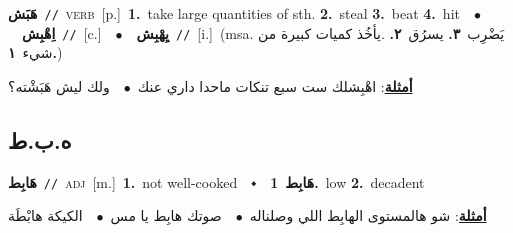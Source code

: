 \documentclass[10pt,a4paper,twoside]{article} %
\begin{document}
\begin{multicols}{2}
{\setlength\topsep{0pt}\textbf{\foreignlanguage{arabic}{هَبَش}}\ {\color{gray}\texttt{//}\color{black}}\ \textsc{verb}\ [p.]\ \textbf{1.}~take large quantities of sth.  \textbf{2.}~steal  \textbf{3.}~beat  \textbf{4.}~hit\ \ $\bullet$\ \ \setlength\topsep{0pt}\textbf{\foreignlanguage{arabic}{اِهْبِش}}\ {\color{gray}\texttt{//}\color{black}}\ [c.]\ \ $\bullet$\ \ \setlength\topsep{0pt}\textbf{\foreignlanguage{arabic}{يِهْبِش}}\ {\color{gray}\texttt{//}\color{black}}\ [i.]\ \color{gray}(msa. \foreignlanguage{arabic}{يَضْرِب}~\foreignlanguage{arabic}{\textbf{٣.}}  \foreignlanguage{arabic}{يسرُق}~\foreignlanguage{arabic}{\textbf{٢.}}  .\foreignlanguage{arabic}{يأخُذ كميات كبيرة من شيء}~\foreignlanguage{arabic}{\textbf{١.}})\color{black}\  \begin{flushright}\color{gray}\foreignlanguage{arabic}{\textbf{\underline{\foreignlanguage{arabic}{أمثلة}}}: اهْبِشلك ست سبع تنكات ماحدا داري عنك\ $\bullet$\ \  ولك ليش هَبَشْته؟}\end{flushright}\color{black}} \vspace{2mm}

\vspace{-3mm}
\subsection*{\color{blue}\foreignlanguage{arabic}{ه.ب.ط}\color{blue}{}} 

{\setlength\topsep{0pt}\textbf{\foreignlanguage{arabic}{هَابِط}}\ {\color{gray}\texttt{//}\color{black}}\ \textsc{adj}\ [m.]\ \textbf{1.}~not well-cooked\ \ $\smblkdiamond$\ \ \setlength\topsep{0pt}\textbf{\foreignlanguage{arabic}{هَابِط}}\ \textbf{1.}~low  \textbf{2.}~decadent\  \begin{flushright}\color{gray}\foreignlanguage{arabic}{\textbf{\underline{\foreignlanguage{arabic}{أمثلة}}}: شو هالمستوى الهابِط اللي وصلناله\ $\bullet$\ \  صوتك هابِط يا مس\ $\bullet$\ \  الكيكة هابْطَة}\end{flushright}\color{black}} \vspace{2mm}


\end{multicols}
\end{document}
